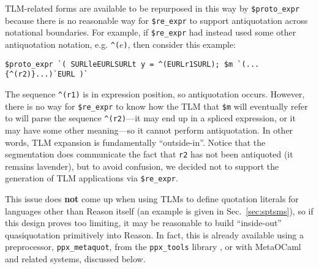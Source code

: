 \documentclass[acmsmall]{acmart}
\newcommand{\li}[1]{\lstinline[basicstyle=\ttfamily\fontsize{9pt}{1em}\selectfont]{#1}}
\begin{document}
TLM-related forms are available to be repurposed in this way by \li{$proto_expr} because there is no reasonable way for \li{$re_expr} to support antiquotation across notational boundaries. For example, if \li{$re_expr} had instead used some other antiquotation notation, e.g. \li{^(}$e$\li{)}, then consider this example:
\begin{lstlisting}[numbers=none]
  $proto_expr `( SURLleEURLSURLt y = ^(EURLr1SURL); $m `(...{^(r2)}...)`EURL )`
\end{lstlisting}
The sequence \li{^(r1)} is in expression position, so antiquotation occurs. However, there is no way for \li{$re_expr} to know how the TLM that \li{$m} will eventually refer to will parse the sequence \li{^(r2)}---it may end up in a spliced expression, or it may have some other meaning---so it cannot perform antiquotation. In other words, TLM expansion is fundamentally ``outside-in''.  Notice that the segmentation does communicate the fact that \li{r2} has not been antiquoted (it remains lavender), but to avoid confusion, we decided not to support the generation of TLM applications via \li{$re_expr}. 

This issue does \textbf{not} come up when using TLMs to define quotation literals for languages other than Reason itself (an example is given in Sec.~\ref{sec:sptsms}), so if this design proves too limiting, it may be reasonable to build ``inside-out'' quasiquotation primitively into Reason. In fact, this is already available using a preprocessor, \li{ppx_metaquot}, from the \li{ppx_tools} library \cite{ppx-tools}, or with MetaOCaml and related systems, discussed below. %
\end{document}
